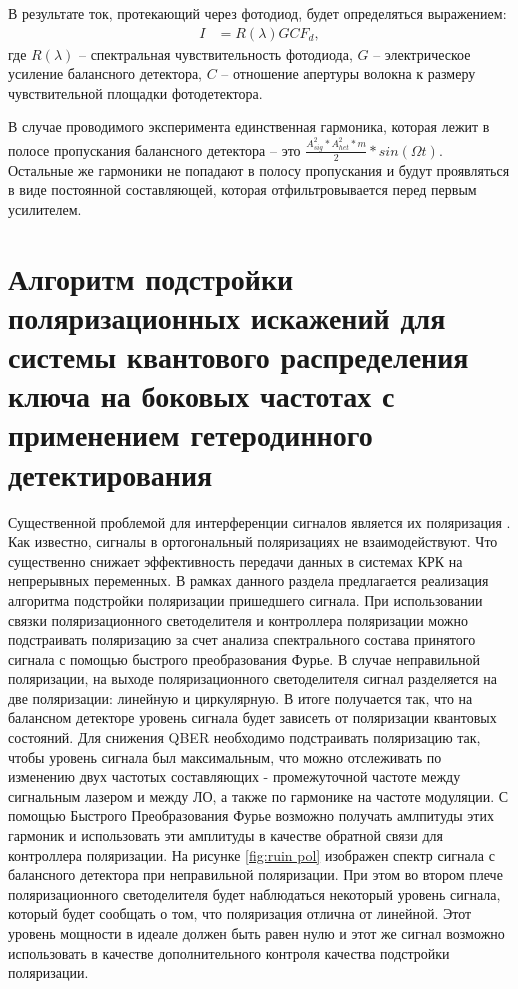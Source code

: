 В результате ток, протекающий через фотодиод, будет определяться выражением:
\begin{align}
   I &= R(\lambda)G C F_d,
\end{align} 
где $R(\lambda)$ -- спектральная чувствительность фотодиода, $G$ -- электрическое усиление балансного детектора, $C$ -- отношение апертуры волокна к размеру чувствительной площадки фотодетектора. 

В случае проводимого эксперимента единственная гармоника, которая лежит в полосе пропускания балансного детектора -- это $\frac{A_{sig}^2 *A_{het}^2 *m}{2} * sin(\Omega t)$.
Остальные же гармоники не попадают в полосу пропускания и будут проявляться в виде постоянной составляющей, которая отфильтровывается перед первым усилителем. 

\section{Алгоритм подстройки поляризационных искажений для системы квантового распределения ключа на боковых частотах с применением гетеродинного детектирования}\label{sec:ch3/sect4}
Существенной проблемой для интерференции сигналов является их поляризация \cite{liu2020a}. Как известно, сигналы в ортогональный поляризациях не взаимодействуют. Что существенно снижает эффективность передачи данных в системах КРК на непрерывных переменных. В рамках данного раздела предлагается реализация алгоритма подстройки поляризации пришедшего сигнала.
При использовании связки поляризационного светоделителя и контроллера поляризации можно подстраивать поляризацию за счет анализа спектрального состава принятого сигнала с помощью быстрого преобразования Фурье. В случае неправильной поляризации, на выходе поляризационного светоделителя сигнал разделяется на две поляризации: линейную и циркулярную. В итоге получается так, что на балансном детекторе уровень сигнала будет зависеть от поляризации квантовых состояний. Для снижения QBER необходимо подстраивать поляризацию так, чтобы уровень сигнала был максимальным, что можно отслеживать по изменению двух частотых составляющих - промежуточной частоте между сигнальным лазером и между ЛО, а также по гармонике на частоте модуляции. С помощью Быстрого Преобразования Фурье возможно получать амлпитуды этих гармоник и использовать эти амплитуды в качестве обратной связи для контроллера поляризации. На рисунке \ref{fig:ruin pol} изображен спектр сигнала с балансного детектора при неправильной поляризации. При этом во втором плече поляризационного светоделителя будет наблюдаться некоторый уровень сигнала, который будет сообщать о том, что поляризация отлична от линейной. Этот уровень мощности в идеале должен быть равен нулю и этот же сигнал возможно использовать в качестве дополнительного контроля качества подстройки поляризации.
